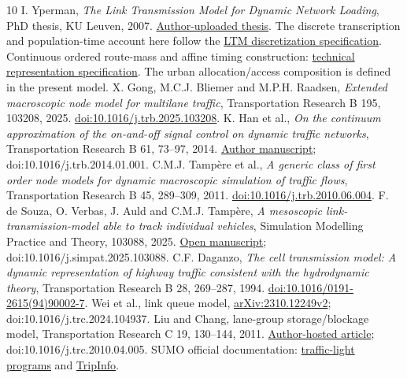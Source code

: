 \documentclass[10pt,a4paper]{article}
\newcommand{\head}[1]{\par\vspace{4pt}\noindent\textbf{#1}\par\nobreak\vspace{1pt}}
\begin{document}
\makeatletter
\renewcommand{\section}{\@ifstar{\head}{\head}}
\makeatother
\begin{thebibliography}{10}
\setlength{\itemsep}{0pt}\setlength{\parskip}{0pt}
{I. Yperman, \emph{The Link Transmission Model for Dynamic
Network Loading}, PhD thesis, KU Leuven, 2007.
\href{https://www.researchgate.net/publication/28360292_The_Link_Transmission_Model_for_dynamic_network_loading}{Author-uploaded thesis}.
The discrete transcription and population-time account here follow the
\href{../../../../docs/milestones/milestone_0_ltm_baseline.md}{LTM discretization specification}.}
{Continuous ordered route-mass and affine timing construction:
\href{../../../../docs/milestones/milestone_1_ordered_route_mass_ledger.md}
{technical representation specification}. The urban allocation/access
composition is defined in the present model.}
{X. Gong, M.C.J. Bliemer and M.P.H. Raadsen,
\emph{Extended macroscopic node model for multilane traffic},
Transportation Research B 195, 103208, 2025.
\href{https://doi.org/10.1016/j.trb.2025.103208}{doi:10.1016/j.trb.2025.103208}.}
{K. Han et al., \emph{On the continuum approximation of the
on-and-off signal control on dynamic traffic networks}, Transportation
Research B 61, 73--97, 2014.
\href{https://arxiv.org/abs/1309.3461}{Author manuscript};
doi:10.1016/j.trb.2014.01.001.}
{C.M.J. Tamp\`ere et al., \emph{A generic class of first order
node models for dynamic macroscopic simulation of traffic flows},
Transportation Research B 45, 289--309, 2011.
\href{https://doi.org/10.1016/j.trb.2010.06.004}{doi:10.1016/j.trb.2010.06.004}.}
{F. de Souza, O. Verbas, J. Auld and C.M.J. Tamp\`ere,
\emph{A mesoscopic link-transmission-model able to track individual vehicles},
Simulation Modelling Practice and Theory, 103088, 2025.
\href{https://www.osti.gov/servlets/purl/2569501}{Open manuscript};
doi:10.1016/j.simpat.2025.103088.}
{C.F. Daganzo, \emph{The cell transmission model: A dynamic
representation of highway traffic consistent with the hydrodynamic theory},
Transportation Research B 28, 269--287, 1994.
\href{https://doi.org/10.1016/0191-2615(94)90002-7}{doi:10.1016/0191-2615(94)90002-7}.}
{Wei et al., link queue model,
\href{https://arxiv.org/html/2310.12249v2}{arXiv:2310.12249v2};
doi:10.1016/j.trc.2024.104937.}
{Liu and Chang, lane-group storage/blockage model,
Transportation Research C 19, 130--144, 2011.
\href{https://attap.umd.edu/wp-content/uploads/2022/05/TRC522.pdf}{Author-hosted article};
doi:10.1016/j.trc.2010.04.005.}
{SUMO official documentation:
\href{https://sumo.dlr.de/docs/Simulation/Traffic_Lights.html}{traffic-light programs}
and \href{https://sumo.dlr.de/docs/Simulation/Output/TripInfo.html}{TripInfo}.}
\end{thebibliography}
\end{document}
